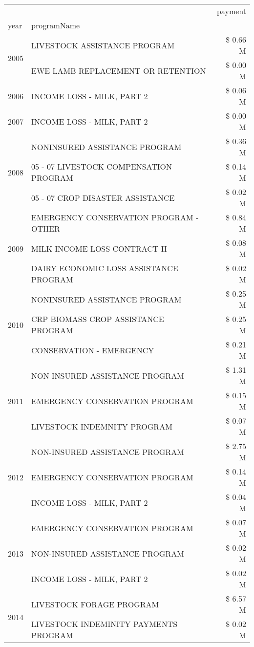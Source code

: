 \begin{tabular}{llr}
\toprule
 &  & payment \\
year & programName &  \\
\midrule
\multirow[t]{2}{*}{2005} & LIVESTOCK ASSISTANCE PROGRAM & \$ 0.66 M \\
 & EWE LAMB REPLACEMENT OR RETENTION & \$ 0.00 M \\
\cline{1-3}
2006 & INCOME LOSS - MILK, PART 2 & \$ 0.06 M \\
\cline{1-3}
2007 & INCOME LOSS - MILK, PART 2 & \$ 0.00 M \\
\cline{1-3}
\multirow[t]{3}{*}{2008} & NONINSURED ASSISTANCE PROGRAM & \$ 0.36 M \\
 & 05 - 07 LIVESTOCK COMPENSATION PROGRAM & \$ 0.14 M \\
 & 05 - 07 CROP DISASTER ASSISTANCE & \$ 0.02 M \\
\cline{1-3}
\multirow[t]{3}{*}{2009} & EMERGENCY CONSERVATION PROGRAM - OTHER & \$ 0.84 M \\
 & MILK INCOME LOSS CONTRACT II & \$ 0.08 M \\
 & DAIRY ECONOMIC LOSS ASSISTANCE PROGRAM & \$ 0.02 M \\
\cline{1-3}
\multirow[t]{3}{*}{2010} & NONINSURED ASSISTANCE PROGRAM & \$ 0.25 M \\
 & CRP BIOMASS CROP ASSISTANCE PROGRAM & \$ 0.25 M \\
 & CONSERVATION - EMERGENCY & \$ 0.21 M \\
\cline{1-3}
\multirow[t]{3}{*}{2011} & NON-INSURED ASSISTANCE PROGRAM & \$ 1.31 M \\
 & EMERGENCY CONSERVATION PROGRAM & \$ 0.15 M \\
 & LIVESTOCK INDEMNITY PROGRAM & \$ 0.07 M \\
\cline{1-3}
\multirow[t]{3}{*}{2012} & NON-INSURED ASSISTANCE PROGRAM & \$ 2.75 M \\
 & EMERGENCY CONSERVATION PROGRAM & \$ 0.14 M \\
 & INCOME LOSS - MILK, PART 2 & \$ 0.04 M \\
\cline{1-3}
\multirow[t]{3}{*}{2013} & EMERGENCY CONSERVATION PROGRAM & \$ 0.07 M \\
 & NON-INSURED ASSISTANCE PROGRAM & \$ 0.02 M \\
 & INCOME LOSS - MILK, PART 2 & \$ 0.02 M \\
\cline{1-3}
\multirow[t]{3}{*}{2014} & LIVESTOCK FORAGE PROGRAM & \$ 6.57 M \\
 & LIVESTOCK INDEMINITY PAYMENTS PROGRAM & \$ 0.02 M \\

\end{tabular}

